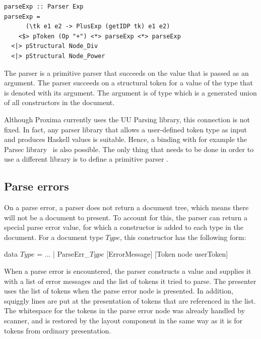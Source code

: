 \documentclass[12pt]{article}
\begin{document}
\begin{footnotesize}
\begin{verbatim}
parseExp :: Parser Exp
parseExp =
      (\tk e1 e2 -> PlusExp (getIDP tk) e1 e2)
    <$> pToken (Op "+") <*> parseExp <*> parseExp
  <|> pStructural Node_Div
  <|> pStructural Node_Power
\end{verbatim}%
\end{footnotesize}

The  parser is a primitive parser that succeeds on the  value that is passed as an argument. The  parser succeeds on a structural token for a value of the type that is denoted with its argument. The argument is of type  which is a generated union of all constructors in the document. 

Although Proxima currently uses the UU Parsing library, this connection is not fixed. In fact, any  parser library that allows a user-defined token type as input and produces Haskell values is suitable. Hence, a binding with for example the Parsec library~\cite{leijen08parsec} is also possible. The only thing that needs to be done in order to use a different library is to define a primitive parser .


\subsection{Parse errors} \label{sect:parseScanErrors}

On a parse error, a parser does not return a document tree, which means there will not be a document to present. To account for this, the parser can return a special parse error value, for which a constructor is added to each type in the document. For a document type $Type$, this constructor has the following form:

\begin{footnotesize}
\begin{tabbedCode}
data $Type$ =
  ...
  | ParseErr\_$Type$ [ErrorMessage] [Token node userToken] 
\end{tabbedCode}
\end{footnotesize}

When a parse error is encountered, the parser constructs a  value and supplies it with a list of error messages and the list of tokens it tried to parse. The presenter uses the list of tokens when the parse error node is presented. In addition, squiggly lines are put at the presentation of tokens that are referenced in the  list. The whitespace for the tokens in the parse error node was already handled by scanner, and is restored by the layout component in the same way as it is for tokens from ordinary presentation.
\end{document}

